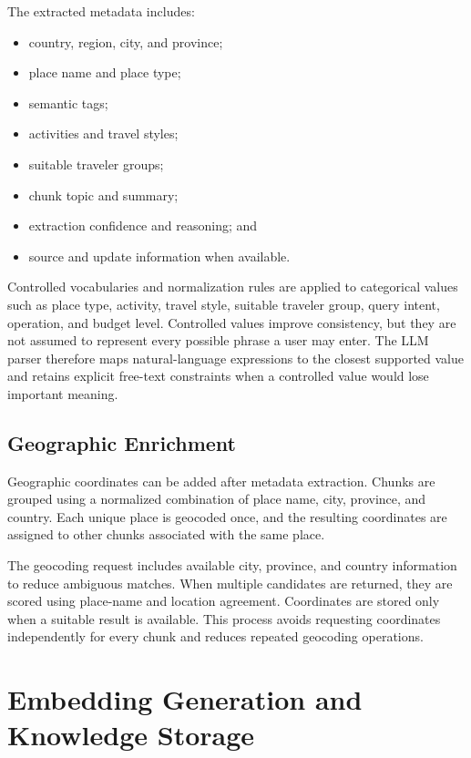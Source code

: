 The extracted metadata includes:

\begin{itemize}
    \item country, region, city, and province;
    \item place name and place type;
    \item semantic tags;
    \item activities and travel styles;
    \item suitable traveler groups;
    \item chunk topic and summary;
    \item extraction confidence and reasoning; and
    \item source and update information when available.
\end{itemize}

Controlled vocabularies and normalization rules are applied to categorical
values such as place type, activity, travel style, suitable traveler group,
query intent, operation, and budget level. Controlled values improve
consistency, but they are not assumed to represent every possible phrase a user
may enter. The LLM parser therefore maps natural-language expressions to the
closest supported value and retains explicit free-text constraints when a
controlled value would lose important meaning.

\subsection{Geographic Enrichment}

Geographic coordinates can be added after metadata extraction. Chunks are
grouped using a normalized combination of place name, city, province, and
country. Each unique place is geocoded once, and the resulting coordinates are
assigned to other chunks associated with the same place.

The geocoding request includes available city, province, and country
information to reduce ambiguous matches. When multiple candidates are
returned, they are scored using place-name and location agreement. Coordinates
are stored only when a suitable result is available. This process avoids
requesting coordinates independently for every chunk and reduces repeated
geocoding operations.

\section{Embedding Generation and Knowledge Storage}

